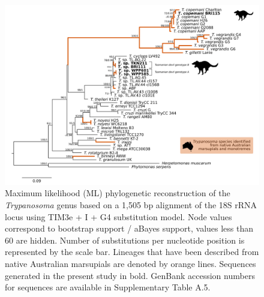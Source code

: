 \documentclass[a4paper, nobind]{templates/ociamthesis}
\begin{document}
\begin{figure}
\includegraphics[width=0.95\linewidth]{figures/ms-figs/Ch6-Fig2} \caption[Phylogenetic tree (18S rDNA) of \textit{Trypanosoma} spp. from the Tasmanian devil.]{Maximum likelihood (ML) phylogenetic reconstruction of the \textit{Trypanosoma} genus based on a 1,505 bp alignment of the 18S rRNA locus using TIM3e + I + G4 substitution model. Node values correspond to bootstrap support / aBayes support, values less than 60 are hidden. Number of substitutions per nucleotide position is represented by the scale bar. Lineages that have been described from native Australian marsupials are denoted by orange lines. Sequences generated in the present study in bold. GenBank accession numbers for sequences are available in Supplementary Table A.5.}\label{fig:F62}
\end{figure}
\end{document}
